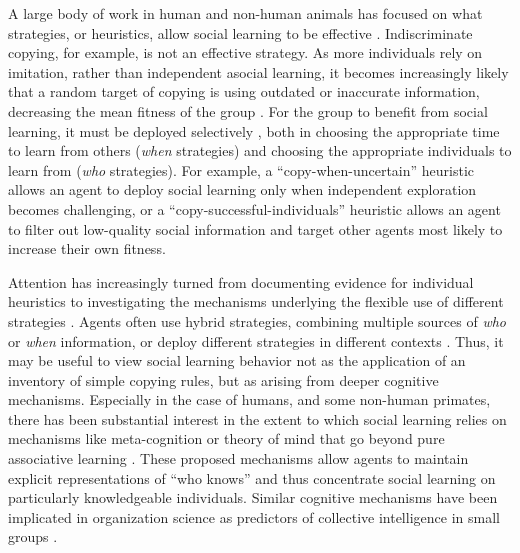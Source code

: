 \documentclass[12pt,letterpaper]{article}
\begin{document}
A large body of work in human and non-human animals has focused on what strategies, or heuristics, allow social learning to be effective \cite{laland_social_2004,hoppitt2013social,RendellFogarty___Laland11_CognitiveCulture}. 
Indiscriminate copying, for example, is not an effective strategy. 
As more individuals rely on imitation, rather than independent asocial learning, it becomes increasingly likely that a random target of copying is using outdated or inaccurate information, decreasing the mean fitness of the group \cite{rogers_does_1988}.
For the group to benefit from social learning, it must be deployed selectively \cite{kameda2003does,boyd1995does,kendal2005trade}, both in choosing the appropriate time to learn from others (\emph{when} strategies) and choosing the appropriate individuals to learn from (\emph{who} strategies). 
For example, a ``copy-when-uncertain'' heuristic allows an agent to deploy social learning only when independent exploration becomes challenging, or a ``copy-successful-individuals'' heuristic allows an agent to filter out low-quality social information and target other agents most likely to increase their own fitness.

Attention has increasingly turned from documenting evidence for individual heuristics to investigating the mechanisms underlying the flexible use of different strategies \cite{heyes2016blackboxing,kendal2018social}. 
Agents often use hybrid strategies, combining multiple sources of \emph{who} or \emph{when} information, or deploy different strategies in different contexts \cite{mcelreath_beyond_2008}.
Thus, it may be useful to view social learning behavior not as the application of an inventory of simple copying rules, but as arising from deeper cognitive mechanisms.
Especially in the case of humans, and some non-human primates, there has been substantial interest in the extent to which social learning relies on mechanisms like meta-cognition \cite{heyes2016knows} or theory of mind \cite{shafto2012learning} that go beyond pure associative learning \cite{behrens2008associative,heyes_whats_2012,heyes2012simple}.
These proposed mechanisms allow agents to maintain explicit representations of ``who knows'' and thus concentrate social learning on particularly knowledgeable individuals.
Similar cognitive mechanisms have been implicated in organization science as predictors of collective intelligence in small groups \cite{woolley2010evidence,engel2014reading}.
\end{document}

